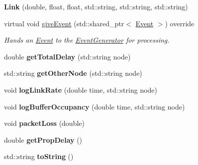 \begin{DoxyCompactItemize}
\item 
\hypertarget{classLink_af0a6ae4d9767bacfb371f52a30441e64}{{\bfseries \-Link} (double, float, float, std\-::string, std\-::string, std\-::string)}\label{classLink_af0a6ae4d9767bacfb371f52a30441e64}

\item 
virtual void \hyperlink{classLink_abd9466c4c2097329f4affd9b2eafbd7a}{give\-Event} (std\-::shared\-\_\-ptr$<$ \hyperlink{classEvent}{\-Event} $>$) override
\begin{DoxyCompactList}\small\item\em \-Hands an \hyperlink{classEvent}{\-Event} to the \hyperlink{classEventGenerator}{\-Event\-Generator} for processing. \end{DoxyCompactList}\item 
\hypertarget{classLink_a19a132f87f8028ccd5af2503084aac64}{double {\bfseries get\-Total\-Delay} (std\-::string node)}\label{classLink_a19a132f87f8028ccd5af2503084aac64}

\item 
\hypertarget{classLink_aaa4e4c72a6384f118846765c296e5634}{std\-::string {\bfseries get\-Other\-Node} (std\-::string node)}\label{classLink_aaa4e4c72a6384f118846765c296e5634}

\item 
\hypertarget{classLink_a0e1ec62377102139e4acc14392e96c12}{void {\bfseries log\-Link\-Rate} (double time, std\-::string node)}\label{classLink_a0e1ec62377102139e4acc14392e96c12}

\item 
\hypertarget{classLink_af07994bcf90cd63abe9edab218a5d752}{void {\bfseries log\-Buffer\-Occupancy} (double time, std\-::string node)}\label{classLink_af07994bcf90cd63abe9edab218a5d752}

\item 
\hypertarget{classLink_a94f034f0b3ebfbf4c08bcae80a5d9904}{void {\bfseries packet\-Loss} (double)}\label{classLink_a94f034f0b3ebfbf4c08bcae80a5d9904}

\item 
\hypertarget{classLink_a6349999e40910091ecea77e2a366aa46}{double {\bfseries get\-Prop\-Delay} ()}\label{classLink_a6349999e40910091ecea77e2a366aa46}

\item 
\hypertarget{classLink_a8c768141c7ebf3b852bf978757f903be}{std\-::string {\bfseries to\-String} ()}\label{classLink_a8c768141c7ebf3b852bf978757f903be}

\end{DoxyCompactItemize}


